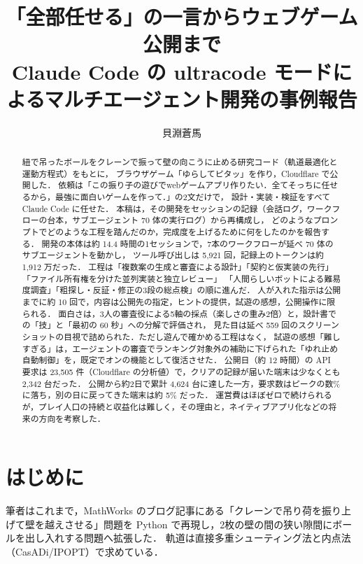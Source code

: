 \documentclass[a4paper,10pt]{ltjsarticle}
\title{「全部任せる」の一言からウェブゲーム公開まで\\
Claude Code の ultracode モードによるマルチエージェント開発の事例報告}
\author{貝淵蒼馬}
\date{}
\begin{document}
\maketitle

\begin{abstract}
紐で吊ったボールをクレーンで振って壁の向こうに止める研究コード（軌道最適化と運動方程式）をもとに，
ブラウザゲーム「ゆらしてピタッ」を作り，Cloudflare で公開した．
依頼は「この振り子の遊びでwebゲームアプリ作りたい．全てそっちに任せるから，最強に面白いゲームを作って．」の2文だけで，
設計・実装・検証をすべて Claude Code に任せた．
本稿は，その開発をセッションの記録（会話ログ，ワークフローの台本，サブエージェント 70 体の実行ログ）から再構成し，
どのようなプロンプトでどのような工程を踏んだのか，完成度を上げるために何をしたのかを報告する．
開発の本体は約 14.4 時間の1セッションで，7本のワークフローが延べ 70 体のサブエージェントを動かし，
ツール呼び出しは 5,921 回，記録上のトークンは約 1,912 万だった．
工程は「複数案の生成と審査による設計」「契約と仮実装の先行」「ファイル所有権を分けた並列実装と独立レビュー」
「人間らしいボットによる難易度調査」「粗探し・反証・修正の3段の総点検」の順に進んだ．
人が入れた指示は公開までに約 10 回で，内容は公開先の指定，ヒントの提供，試遊の感想，公開操作に限られる．
面白さは，3人の審査役による5軸の採点（楽しさの重み2倍）と，設計書での「技」と「最初の 60 秒」への分解で評価され，
見た目は延べ 559 回のスクリーンショットの目視で詰められた．ただし遊んで確かめる工程はなく，
試遊の感想「難しすぎる」は，エージェントの審査でランキング対象外の補助に下げられた「ゆれ止め自動制御」を，既定でオンの機能として復活させた．
公開日（約 12 時間）の API 要求は 23,505 件（Cloudflare の分析値）で，クリアの記録が届いた端末は少なくとも 2,342 台だった．
公開から約2日で累計 4,624 台に達した一方，要求数はピークの数\%に落ち，別の日に戻ってきた端末は約 5\% だった．
運営費はほぼゼロで続けられるが，プレイ人口の持続と収益化は難しく，その理由と，ネイティブアプリ化などの将来の方向を考察した．
\end{abstract}

\section{はじめに}

筆者はこれまで，MathWorks のブログ記事\cite{gulley2026}にある「クレーンで吊り荷を振り上げて壁を越えさせる」問題を
Python で再現し，2枚の壁の間の狭い隙間にボールを出し入れする問題へ拡張した\cite{kaibuchi2026}．
軌道は直接多重シューティング法と内点法（CasADi/IPOPT）で求めている．
\end{document}
